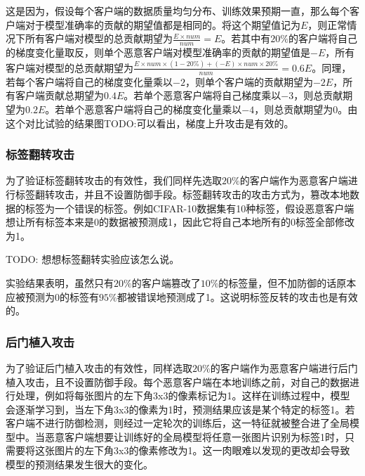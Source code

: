 \documentclass[conference]{IEEEtran}
\begin{document}
这是因为，假设每个客户端的数据质量均匀分布、训练效果预期一直，那么每个客户端对于模型准确率的贡献的期望值都是相同的。将这个期望值记为$E$，则正常情况下所有客户端对模型的总贡献期望为$\frac{E\times num}{num}=E$。若其中有$20\%$的客户端将自己的梯度变化量取反，则单个恶意客户端对模型准确率的贡献的期望值是$-E$，所有客户端对模型的总贡献期望为$\frac{E\times num\times(1-20\%)+(-E)\times num\times 20\%}{num} = 0.6E$。同理，若每个客户端将自己的梯度变化量乘以$-2$，则单个客户端的贡献期望为$-2E$，所有客户端贡献总期望为$0.4E$。若单个恶意客户端将自己梯度乘以$-3$，则总贡献期望为$0.2E$。若单个恶意客户端将自己的梯度变化量乘以$-4$，则总贡献期望为$0$。由这个对比试验的结果图TODO:可以看出，梯度上升攻击是有效的。

\subsubsection{\textbf{标签翻转攻击}}
\label{exp:attack:label}

为了验证标签翻转攻击的有效性，我们同样先选取$20\%$的客户端作为恶意客户端进行标签翻转攻击，并且不设置防御手段。标签翻转攻击的攻击方式为，篡改本地数据的标签为一个错误的标签。例如CIFAR-10数据集有10种标签，假设恶意客户端想让所有标签本来是0的数据被预测成1，因此它将自己本地所有的0标签全部修改为1。

TODO: 想想标签翻转实验应该怎么说。

实验结果表明，虽然只有$20\%$的客户端篡改了$10\%$的标签量，但不加防御的话原本应被预测为0的标签有$95\%$都被错误地预测成了1。这说明标签反转的攻击也是有效的。

\subsubsection{\textbf{后门植入攻击}}
\label{exp:attack:backdoor}

为了验证后门植入攻击的有效性，同样选取$20\%$的客户端作为恶意客户端进行后门植入攻击，且不设置防御手段。每个恶意客户端在本地训练之前，对自己的数据进行处理，例如将每张图片的左下角3x3的像素标记为1。这样在训练过程中，模型会逐渐学习到，当左下角3x3的像素为1时，预测结果应该是某个特定的标签1。若客户端不进行防御检测，则经过一定轮次的训练后，这一特征就被整合进了全局模型中。当恶意客户端想要让训练好的全局模型将任意一张图片识别为标签1时，只需要将这张图片的左下角3x3的像素修改为1。这一肉眼难以发现的更改却会导致模型的预测结果发生很大的变化。
\end{document}
